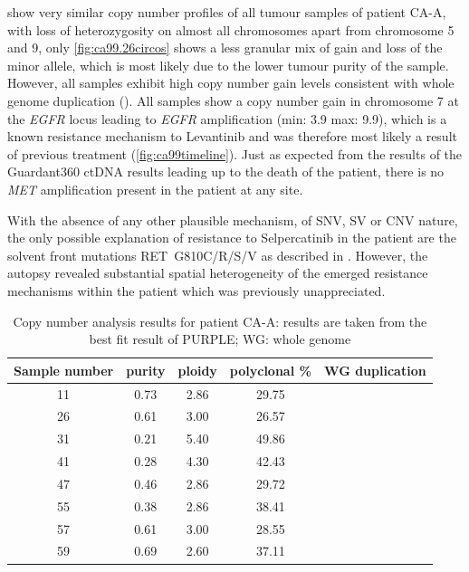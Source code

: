  show very similar copy number profiles of all tumour samples of patient CA-A, with loss of heterozygosity on almost all chromosomes apart from chromosome 5 and 9, only \autoref{fig:ca99.26circos} shows a less granular mix of gain and loss of the minor allele, which is most likely due to the lower tumour purity of the sample. However, all samples exhibit high copy number gain levels consistent with whole genome duplication (). All samples show a copy number gain in chromosome 7 at the \textit{EGFR} locus leading to \textit{EGFR} amplification (min: 3.9 max: 9.9), which is a known resistance mechanism to Levantinib \cite{Jin2021} and was therefore most likely a result of previous treatment (\autoref{fig:ca99timeline}). Just as expected from the results of the Guardant360 ctDNA results leading up to the death of the patient, there is no \textit{MET} amplification present in the patient at any site.

With the absence of any other plausible mechanism, of SNV, SV or CNV nature, the only possible explanation of resistance to Selpercatinib in the patient are the solvent front mutations RET~G810C/R/S/V as described in \textcite{Solomon2020}. However, the autopsy revealed substantial spatial heterogeneity of the emerged resistance mechanisms within the patient which was previously unappreciated.

\begin{table}[ht]
\caption[Copy number analysis results for patient CA-A]{Copy number analysis results for patient CA-A: results are taken from the best fit result of PURPLE; WG: whole genome}\label{tab:ca99cnv}
\centering
{}
\begin{tabular}{|c|c|c|c|c|}
\toprule
\hline
 \rowcolor{gray!50}
\textbf{Sample number} & \textbf{purity} & \textbf{ploidy} & \textbf{polyclonal \%} & \textbf{WG duplication}\\
\hline
 11 & \num{0.73} &	 \num{2.86} &	\num{29.75} & \cellcolor{white}	\\
 26 & \num{0.61} & \num{3.00} & \num{26.57} & \cellcolor{white} \\
 31 & \num{0.21} & \num{5.40} & \num{49.86} & \cellcolor{white} \\
 41 & \num{0.28} & \num{4.30} & \num{42.43} & \cellcolor{white} \\
 47 & \num{0.46} & \num{2.86} & \num{29.72} & \cellcolor{white} \\
 55 & \num{0.38} & \num{2.86} & \num{38.41} & \cellcolor{white} \\
 57 & \num{0.61} & \num{3.00} & \num{28.55} & \cellcolor{white} \\
 59 & \num{0.69} & \num{2.60} & \num{37.11} & \cellcolor{white}\multirow{-8}{*}{True} \\
 \hline
\bottomrule
\end{tabular}
\end{table} 

